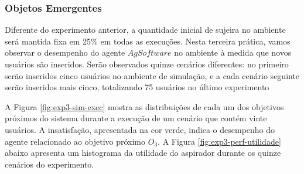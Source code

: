 \subsubsection{Objetos Emergentes}

Diferente do experimento anterior, a quantidade inicial de sujeira no ambiente será mantida fixa em 25\% em todas as execuções. Nesta terceira prática, vamos observar o desempenho do agente $AgSoftware$ no ambiente à medida que novos usuários são inseridos. Serão observados quinze cenários diferentes: no primeiro serão inseridos cinco usuários no ambiente de simulação, e a  cada cenário seguinte serão inseridos mais cinco, totalizando 75 usuários no último experimento

\clearpage
\begin{figure}[h!]
    \centering
\end{figure}

A Figura \ref{fig:exp3-sim-exec} mostra as distribuições de cada um dos objetivos próximos do sistema durante a execução de um cenário que contém vinte usuários. A insatisfação, apresentada na cor verde, indica o desempenho do agente relacionado ao objetivo próximo $O_3$.  A Figura \ref{fig:exp3-perf-utilidade} abaixo apresenta um histograma da utilidade do aspirador durante os quinze cenários do experimento. 

\begin{figure}[h!]
    \centering
\end{figure}

